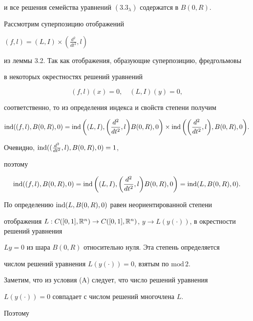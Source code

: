 \begin{pf}
\begin{pf}
и все решения семейства уравнений $(3.3_\lambda)$ содержатся в $B(0, R)$.


Рассмотрим суперпозицию отображений


$(f, l) = (L, I) \times (\frac{d^2}{dt^2}, l)$


из леммы 3.2. Так как отображения, образующие суперпозицию, фредгольмовы


в некоторых окрестностях решений уравнений 


$$


(f, l)(x) = 0, \quad (L, I)(y) = 0,


$$


соответственно, то из определения индекса и свойств степени получим


$$


\Ind((f, l), B(0, R), 0) = 


\Ind\bigg((L, I), \bigg(\frac{d^2}{dt^2}, 


l\bigg)B(0, R), 0\bigg)\times


\Ind\bigg(\bigg(\frac{d^2}{dt^2}, l\bigg), B(0, R), 0\bigg).


$$


Очевидно, $\operatorname{ind}((\frac{d^2}{dt^2}, l), B(0, R), 0)=1$,


поэтому 


$$


\Ind ((f, l), B(0, R), 0)=


\Ind \bigg((L, I), \bigg(\frac{d^2}{dt^2}, l\bigg)


B(0, R), 0\bigg) =


\Ind (L, B(0, R), 0).


$$


По определению $\operatorname{ind}(L, B(0, R), 0)$ равен неориентированной степени 


отображения $L:C([0,1],\linebreak {\Bbb R}^n)\rightarrow C([0,1], 


{\Bbb R}^n)$, $y\rightarrow L(y(\cdot))$, в окрестности решений уравнения


$L y=0$ из шара $B(0, R)$ относительно нуля. Эта степень определяется


числом решений уравнения $L(y(\cdot))=0$, взятым по $\text{mod}\,2$.





Заметим, что из условия (A) следует, что число решений уравнения


$L(y(\cdot))=0$ совпадает с числом решений многочлена $L$.


Поэтому 



\end{pf}
\end{pf}
